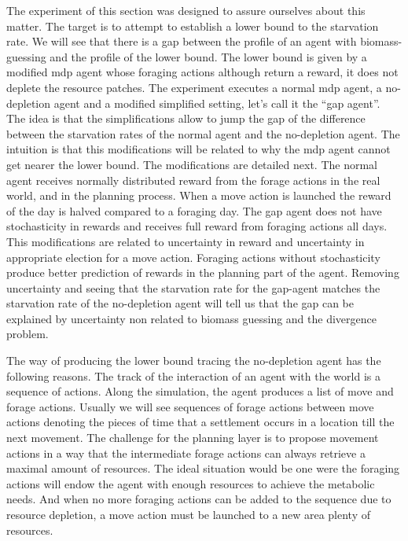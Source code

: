 \documentclass[11pt,oneside,a4paper,openright]{report}
\begin{document}
The experiment of this section was designed to assure ourselves about this matter. The target is to attempt 
to establish a lower bound to the starvation rate. We will see that there is a gap between the profile of 
an agent with biomass-guessing and the profile of the lower bound. The lower bound is given by a modified 
mdp agent whose foraging actions although return a reward, it does not deplete the resource patches. 
The experiment executes a normal mdp agent, a no-depletion agent and a modified simplified setting, let's call
it the ``gap agent''. The idea is that the simplifications allow to jump the gap of the difference between the 
starvation rates of the normal agent and the no-depletion agent. The intuition is that this modifications 
will be related to why the mdp agent cannot get nearer the lower bound. The modifications are detailed next. 
The normal agent receives normally distributed reward from the forage actions in the real world, and in the 
planning process. When a move action is launched the reward of the day is halved compared to a foraging 
day. The gap agent does not have stochasticity in rewards and receives full reward from foraging actions all 
days. This modifications are related to uncertainty in reward and uncertainty in appropriate election for a 
move action. Foraging actions without stochasticity produce better prediction of rewards in the planning part 
of the agent. Removing uncertainty and seeing that the starvation rate for the gap-agent matches the 
starvation rate of the no-depletion agent will tell us that the gap can be explained by uncertainty non 
related to biomass guessing and the divergence problem.

The way of producing the lower bound tracing the no-depletion agent has the following reasons. The track of 
the interaction of an agent with the world is a sequence of actions. Along the simulation, the agent produces 
a list of move and forage actions. Usually we will see sequences of forage actions between move actions 
denoting the pieces of time that a settlement occurs in a location till the next movement. The challenge 
for the planning layer is to propose movement actions in a way that the intermediate forage actions can 
always retrieve a maximal amount of resources. The ideal situation would be one were the foraging actions 
will endow the agent with enough resources to achieve the metabolic needs. And when no more foraging actions 
can be added to the sequence due to resource depletion, a move action must be launched to a new area plenty 
of resources. 
\end{document}
